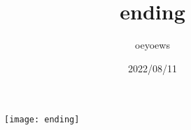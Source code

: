 \documentclass[UTF8]{ctexart}
\title{ending}
\author{oeyoews}
\date{2022/08/11}
\begin{document}
\maketitle


\begin{figure}[htpb]
	\centering
	\texttt{[image: ending]}
	\label{fig:img-ending-png}
\end{figure}
\end{document}
